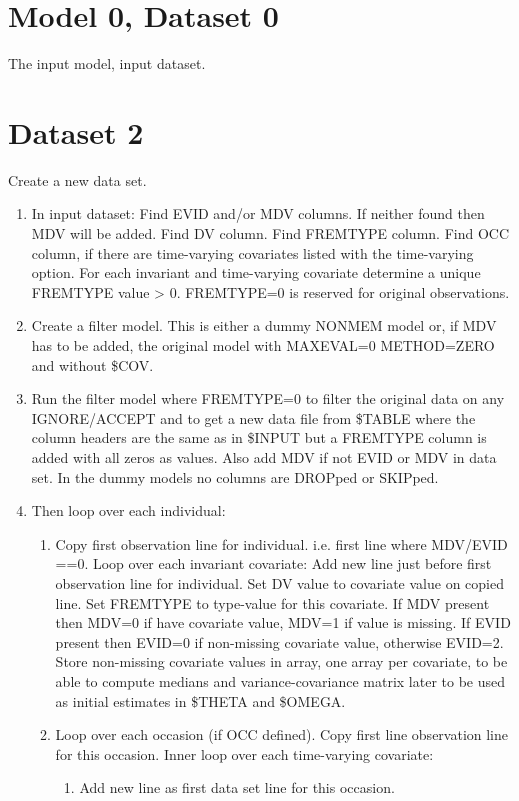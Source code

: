 \section{Model 0, Dataset 0}
The input model, input dataset.

\section{Dataset 2}
Create a new data set.
\begin{enumerate} 
	\item In input dataset: Find EVID and/or MDV columns. If neither found then MDV will be added. Find DV column. Find FREMTYPE column. Find OCC column, if there are time-varying covariates listed with the time-varying option. For each invariant and time-varying covariate  determine a unique FREMTYPE value > 0. FREMTYPE=0 is reserved for original observations.
    \item Create a filter model. This is either a dummy NONMEM model or, if MDV has to be added, the original model with MAXEVAL=0 METHOD=ZERO and without \$COV. 
	\item Run the filter model where FREMTYPE=0 to filter the original data on any IGNORE/ACCEPT and to get a new data file from \$TABLE where the column headers are the same as in \$INPUT but a FREMTYPE column is added with all zeros as values. Also add MDV if not EVID or MDV in data set. In the dummy models no columns are DROPped or SKIPped.
\item Then loop over each individual: 
\begin{enumerate}
	\item Copy first observation line for individual. i.e. first line where MDV/EVID ==0. 
Loop over each invariant covariate: Add new line just before first observation line for individual. 
Set DV value to covariate value on copied line. 
Set FREMTYPE to type-value for this covariate. 
If MDV present then MDV=0 if have covariate value, MDV=1 if value is missing. 
If EVID present then EVID=0 if non-missing covariate value, otherwise EVID=2. 
Store non-missing covariate values in array, one array per covariate, to be able to compute medians and 
variance-covariance matrix later to be used as initial estimates in \$THETA and \$OMEGA. 
	\item Loop over each occasion (if OCC defined). 
Copy first line observation line for this occasion. 
Inner loop over each time-varying covariate: 
\begin{enumerate}
	\item Add new line as first data set line for this occasion. 

\end{enumerate}
\end{enumerate}
\end{enumerate}
